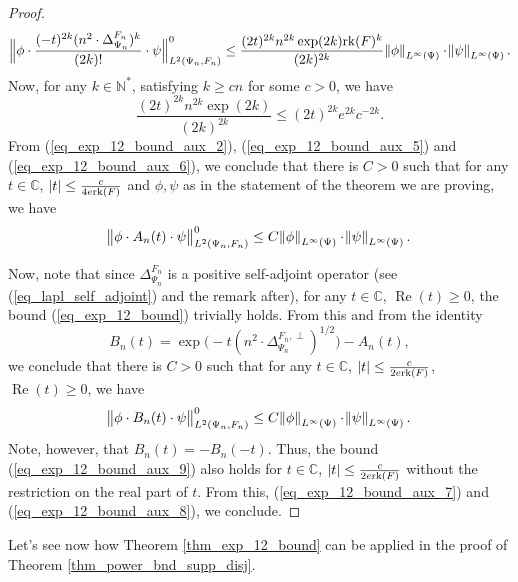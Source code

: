 \documentclass[12pt]{article}
\numberwithin{equation}{section}
\theoremstyle{theorem}
\theoremstyle{definition}
\theoremstyle{remark}
\newcommand{\comp}{\mathbb{C}}
\newcommand{\nat}{\mathbb{N}}
\newcommand{\laplcomp}{\Delta}
\newcommand{\rk}[1]{{\rm{rk}} ( #1 )}
\renewcommand{\Re}{\operatorname{Re}}
\begin{document}
\begin{proof}
\begin{equation}
			\Big \|
			\phi \cdot \frac{(-t)^{2k} (n^2 \cdot\laplcomp_{\Psi_n}^{F_n})^{k} }{(2k)!} \cdot \psi
			\Big \|_{L^2(\Psi_n, F_n)}^{0}
			\leq
			\frac{(2t)^{2k} n^{2k} \exp(2k)  \rk{F}^k}{(2k)^{2k}}
			\norm{\phi}_{L^{\infty}(\Psi)} \cdot \norm{\psi}_{L^{\infty}(\Psi)}.
		\end{equation}
		Now, for any $k \in \nat^*$, satisfying $k \geq cn$ for some $c > 0$, we have
		\begin{equation}\label{eq_exp_12_bound_aux_6}
			\frac{(2t)^{2k} n^{2k} \exp(2k) }{(2k)^{2k}} \leq (2t)^{2k} e^{2k} c^{-2k}.
		\end{equation}
		From (\ref{eq_exp_12_bound_aux_2}), (\ref{eq_exp_12_bound_aux_5}) and (\ref{eq_exp_12_bound_aux_6}), we conclude that there is $C > 0$ such that for any $t \in \comp$, $|t| \leq \frac{c}{4 e \rk{F}}$ and $\phi, \psi$ as in the statement of the theorem we are proving, we have
		\begin{equation}\label{eq_exp_12_bound_aux_7}
			\norm{\phi \cdot A_n(t) \cdot \psi}_{L^2(\Psi_n, F_n)}^{0}
			\leq
			C \norm{\phi}_{L^{\infty}(\Psi)} \cdot \norm{\psi}_{L^{\infty}(\Psi)}.
		\end{equation}
		\par Now, note that since $\laplcomp_{\Psi_n}^{F_n}$ is a positive self-adjoint operator (see (\ref{eq_lapl_self_adjoint}) and the remark after), for any $t \in \comp$, $\Re(t) \geq 0$, the bound (\ref{eq_exp_12_bound}) trivially holds.
		From this and from the identity 
		\begin{equation}\label{eq_exp_12_bound_aux_8}
			B_n(t) 
			=
			\exp \big(-t (n^2 \cdot\laplcomp_{\Psi_n}^{F_n, \perp})^{1/2} \big) 
			-
			A_n(t),
		\end{equation}
		we conclude that there is $C > 0$ such that for any $t \in \comp$, $|t| \leq \frac{c}{2 e  \rk{F}}$, $\Re(t) \geq 0$, we have
		\begin{equation}\label{eq_exp_12_bound_aux_9}
			\norm{\phi \cdot B_n(t) \cdot \psi}_{L^2(\Psi_n, F_n)}^{0}
			\leq
			C \norm{\phi}_{L^{\infty}(\Psi)} \cdot \norm{\psi}_{L^{\infty}(\Psi)}.
		\end{equation}
		Note, however, that $B_n(t) = - B_n(-t)$. Thus, the bound (\ref{eq_exp_12_bound_aux_9}) also holds for $t \in \comp$, $|t| \leq \frac{c}{2 e  \rk{F}}$ without the restriction on the real part of $t$. 
		From this, (\ref{eq_exp_12_bound_aux_7}) and (\ref{eq_exp_12_bound_aux_8}), we conclude.
	\end{proof}
	Let's see now how Theorem \ref{thm_exp_12_bound} can be applied in the proof of  Theorem \ref{thm_power_bnd_supp_disj}.
\end{document}

